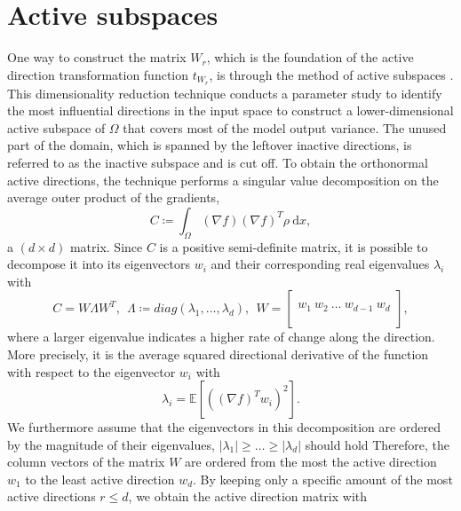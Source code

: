 \documentclass[
  a4paper,  %
  twoside,  %
  bibliography=totoc,
  headsepline,
  cleardoublepage=empty,
  parskip=half,
  draft=false
]{scrbook}
\begin{document}
\section{Active subspaces}
\label{sec:as}

One way to construct the matrix $W_r$, which is the foundation of the active direction transformation function $t_{W_r}$, is through the method of active subspaces \cite{Constantine2015}.
This dimensionality reduction technique conducts a parameter study to identify the most influential directions in the input space to construct a lower-dimensional active subspace of $\Omega$ that covers most of the model output variance.
The unused part of the domain, which is spanned by the leftover inactive directions, is referred to as the inactive subspace and is cut off.
To obtain the orthonormal active directions, the technique performs a singular value decomposition on the average outer product of the gradients,
\begin{equation}
C \coloneqq \int_{\Omega} (\nabla f) (\nabla f)^T \rho ~ \mathrm{d}x,
\label{eq:as_c}
\end{equation}
a $(d \times d)$ matrix.
Since $C$ is a positive semi-definite matrix, it is possible to decompose it into its eigenvectors $w_i$ and their corresponding real eigenvalues $\lambda_i$ with
\begin{equation}
C = W \Lambda W^T, ~~ \Lambda \coloneqq diag(\lambda_1, \dots, \lambda_d), ~~ W =
  \begin{bmatrix}
  \\
    w_1 ~ w_2 ~ \dots ~ w_{d-1} ~ w_d\\
    \\
  \end{bmatrix},
\end{equation}
where a larger eigenvalue indicates a higher rate of change along the direction.
More precisely, it is the average squared directional derivative of the function with respect to the eigenvector $w_i$ \cite{Constantine2014} with
\begin{equation}
\lambda_i=\mathds{E}\left[\left(\left(\nabla f\right)^T w_i\right)^2\right].
\label{eigenvalues}
\end{equation}
%
We furthermore assume that the eigenvectors in this decomposition are ordered by the magnitude of their eigenvalues, \ie $|\lambda_1| \geq \dots \geq |\lambda_d|$ should hold
Therefore, the column vectors of the matrix $W$ are ordered from the most the active direction $w_1$ to the least active direction $w_d$.
By keeping only a specific amount of the most active directions $r \leq d$, we obtain the active direction matrix with
\end{document}
